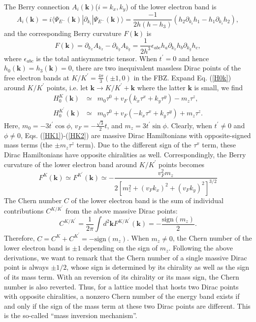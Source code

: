 \documentclass[amsmath,superscriptaddress,showpacs,aps,prl,twocolumn]{revtex4-1}
\begin{document}
The Berry connection $A_i(\mathbf{k})$($i=k_x,k_y$) of the lower electron band is
\begin{equation*}
A_i(\mathbf{k}) = i\langle\Psi_{E^-}(\mathbf{k})|\partial_{k_i}|\Psi_{E^-}(\mathbf{k})\rangle
                         = \frac{-1}{2h\left(h-h_3\right)}\left(h_2\partial_{k_i}h_1-h_1\partial_{k_i}h_2\right),
\end{equation*}
and the corresponding Berry curvature $F(\mathbf{k})$ is
\begin{equation*}
F(\mathbf{k}) = \partial_{k_x}A_{k_x}-\partial_{k_y}A_{k_y}
              = \frac{1}{2h^3}\epsilon_{abc}h_a\partial_{k_x}h_b\partial_{k_y}h_c,
\end{equation*}
where $\epsilon_{abc}$ is the total antisymmetric tensor. When $t^\prime=0$ and hence $h_0(\mathbf{k})=h_3(\mathbf{k})=0$, there are two inequivalent massless Dirac points of the free electron bands at $K/K^\prime=\frac{4\pi}{3}(\pm1,0)$ in the FBZ. Expand Eq. (\ref{H0k}) around $K/K^\prime$ points, i.e. let $\mathbf{k}\rightarrow K/K^\prime+\mathbf{k}$ where the latter $\mathbf{k}$ is small, we find
\begin{eqnarray}
H_0^K(\mathbf{k})          &\simeq& m_0\tau^0+v_F\left(k_x\tau^x+k_y\tau^y\right)-m_z\tau^z, \label{HK1} \\
H_0^{K^\prime}(\mathbf{k}) &\simeq& m_0\tau^0+v_F\left(-k_x\tau^x+k_y\tau^y\right)+m_z\tau^z. \label{HK2}
\end{eqnarray}
Here, $m_0=-3t^\prime\cos\phi$, $v_F=-\frac{\sqrt{3}}{2}t$, and $m_z=3t^\prime\sin\phi$. Clearly, when $t^\prime\ne0$ and $\phi\ne0$, Eqs. (\ref{HK1})-(\ref{HK2}) are massive Dirac Hamiltonians with opposite-signed mass terms (the $\pm m_z\tau^z$ term). Due to the different sign of the $\tau^x$ term, these Dirac Hamiltonians have opposite chiralities as well. Correspondingly, the Berry curvature of the lower electron band around $K/K^\prime$ points becomes
\begin{equation*}
F^K(\mathbf{k})\simeq F^{K^\prime}(\mathbf{k})\simeq-\frac{v_F^2m_z}{2\left[m_z^2+(v_Fk_x)^2+(v_Fk_y)^2\right]^{3/2}}
\end{equation*}
The Chern number $C$ of the lower electron band is the sum of individual contributions $C^{K/K^\prime}$ from the above massive Dirac points:
\begin{equation*}
C^{K/K^\prime}=\frac{1}{2\pi}\int d^2\mathbf{k} F^{K/K^\prime}(\mathbf{k})=-\frac{\text{sign}(m_z)}{2}.
\end{equation*}
Therefore, $C=C^K+C^{K^\prime}=-\text{sign}(m_z)$. When $m_z\ne0$, the Chern number of the lower electron band is $\pm1$ depending on the sign of $m_z$. Following the above derivations, we want to remark that the Chern number of a single massive Dirac point is always $\pm1/2$, whose sign is determined by its chirality as well as the sign of its mass term. With an reversion of its chirality or its mass sign, the Chern number is also reverted. Thus, for a lattice model that hosts two Dirac points with opposite chiralities, a nonzero Chern number of the energy band exists if and only if the sign of the mass term at these two Dirac points are different. This is the so-called ``mass inversion mechanism''.
\end{document}

